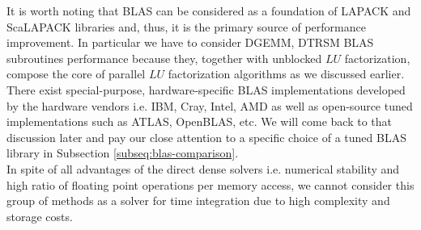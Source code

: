 It is worth noting that BLAS can be considered as a foundation of LAPACK and ScaLAPACK libraries and, thus, it is the primary source of performance improvement. In particular we have to consider DGEMM, DTRSM BLAS subroutines performance because they, together with unblocked $LU$ factorization, compose the core of parallel $LU$ factorization algorithms as we discussed earlier.\\

There exist special-purpose, hardware-specific BLAS implementations developed by the hardware vendors i.e. IBM, Cray, Intel, AMD as well as open-source tuned implementations such as ATLAS, OpenBLAS, etc. We will come back to that discussion later and pay our close attention to a specific choice of a tuned BLAS library in Subsection \ref{subseq:blas-comparison}.\\

In spite of all advantages of the direct dense solvers i.e. numerical stability and high ratio of floating point operations per memory access, we cannot consider this group of methods as a solver for time integration due to high complexity and storage costs.
